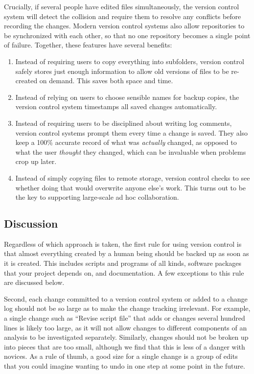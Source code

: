 \documentclass[10pt]{article}
\begin{document}
Crucially, if several people have edited files simultaneously, the
version control system will detect the collision and require them to
resolve any conflicts before recording the changes. Modern version
control systems also allow repositories to be synchronized with each
other, so that no one repository becomes a single point of failure.
Together, these features have several benefits:

\begin{enumerate}
\item
  Instead of requiring users to copy everything into subfolders, version
  control safely stores just enough information to allow old versions of
  files to be re-created on demand. This saves both space and time.
\item
  Instead of relying on users to choose sensible names for backup
  copies, the version control system timestamps all saved changes
  automatically.
\item
  Instead of requiring users to be disciplined about writing log
  comments, version control systems prompt them every time a change is
  saved. They also keep a 100\% accurate record of what was
  \emph{actually} changed, as opposed to what the user \emph{thought}
  they changed, which can be invaluable when problems crop up later.
\item
  Instead of simply copying files to remote storage, version control
  checks to see whether doing that would overwrite anyone else's work.
  This turns out to be the key to supporting large-scale ad hoc
  collaboration.
\end{enumerate}

\subsection*{Discussion}

Regardless of which approach is taken, the first rule for using version
control is that almost everything created by a human being should be
backed up as soon as it is created. This includes scripts and programs
of all kinds, software packages that your project depends on, and
documentation. A few exceptions to this rule are discussed below.

Second, each change committed to a version control system or added to a
change log should not be so large as to make the change tracking
irrelevant. For example, a single change such as ``Revise script file''
that adds or changes several hundred lines is likely too large, as it
will not allow changes to different components of an analysis to be
investigated separately. Similarly, changes should not be broken up into
pieces that are too small, although we find that this is less of a
danger with novices. As a rule of thumb, a good size for a single change
is a group of edits that you could imagine wanting to undo in one step
at some point in the future.
\end{document}
